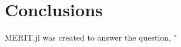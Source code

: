 \setcounter{chapter}{5}
\setcounter{section}{0}
\setcounter{subsection}{0}
\chapter*{Conclusions}
MERIT.jl was created to answer the question, "